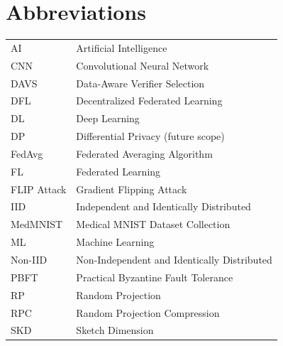 \chapter*{Abbreviations}\label{LstAbb} 

\begin{flushleft}
\begin{longtable}{lp{11cm}}
	
AI & Artificial Intelligence \\
CNN & Convolutional Neural Network \\
DAVS & Data-Aware Verifier Selection \\
DFL & Decentralized Federated Learning \\
DL & Deep Learning \\
DP & Differential Privacy (future scope) \\
FedAvg & Federated Averaging Algorithm \\
FL & Federated Learning \\
FLIP Attack & Gradient Flipping Attack \\
IID & Independent and Identically Distributed \\
MedMNIST & Medical MNIST Dataset Collection \\
ML & Machine Learning \\
Non-IID & Non-Independent and Identically Distributed \\
PBFT & Practical Byzantine Fault Tolerance \\
RP & Random Projection \\
RPC & Random Projection Compression \\
SKD & Sketch Dimension \\

\end{longtable}
\end{flushleft}
